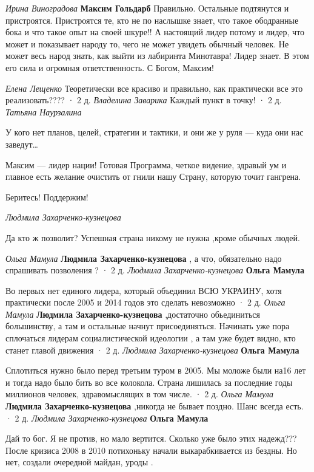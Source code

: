 \begin{itemize}
\begin{itemize}
\emph{Ирина Виноградова}
\textbf{Максим Гольдарб} Правильно. Остальные подтянутся и пристроятся.
Пристроятся те, кто не по наслышке знает, что такое ободранные бока и что такое
опыт на своей шкуре!! А настоящий лидер потому и лидер, что может и показывает
народу то, чего не может увидеть обычный человек. Не может весь народ знать,
как выйти из лабиринта Минотавра! Лидер знает. В этом его сила и огромная
ответственность. С Богом, Максим!
\end{itemize}

\emph{Елена Лещенко}
Теоретически все красиво и правильно, как практически все это реализовать????
 · 2 д.
\emph{Владелина Заварика}
Каждый пункт в точку!
 · 2 д.
\emph{Татьяна Наурзалина}

У кого нет планов, целей, стратегии и тактики, и они же у руля — куда они нас
заведут…

Максим — лидер нации! Готовая Программа, четкое видение, здравый ум и главное
есть желание очистить от гнили нашу Страну, которую точит гангрена.

Беритесь! Поддержим!

\emph{Людмила Захарченко-кузнецова}

Да кто ж позволит? Успешная страна никому не нужна ,кроме обычных людей.

\begin{itemize}
\emph{Ольга Мамула}
\textbf{Людмила Захарченко-кузнецова} , а что, обязательно надо спрашивать позволения ?
 · 2 д.
\emph{Людмила Захарченко-кузнецова}
\textbf{Ольга Мамула} 

Во первых нет единого лидера, который объединил ВСЮ УКРАИНУ, хотя практически
после 2005 и 2014 годов это сделать невозможно
 · 2 д.
\emph{Ольга Мамула}
\textbf{Людмила Захарченко-кузнецова} ,достаточно обьединиться большинству, а
там и остальные начнут присоединяться. Начинать уже пора сплочаться лидерам
социалистической идеологии , а там уже будет видно, кто станет главой движения
 · 2 д.
\emph{Людмила Захарченко-кузнецова}
\textbf{Ольга Мамула} 

Сплотиться нужно было перед третьим туром в 2005. Мы
моложе были на16 лет и тогда надо было бить во все колокола. Страна лишилась за
последние годы миллионов человек, здравомыслящих в том числе.
 · 2 д.
\emph{Ольга Мамула}
\textbf{Людмила Захарченко-кузнецова} ,никогда не бывает поздно. Шанс всегда есть.
 · 2 д.
\emph{Людмила Захарченко-кузнецова}
\textbf{Ольга Мамула} 

Дай то бог. Я не против, но мало вертится. Сколько уже было
этих надежд??? После кризиса 2008 в 2010 потихоньку начали выкарабкивается из
бездны. Но нет, создали очередной майдан, уроды .


\end{itemize}
\end{itemize}
